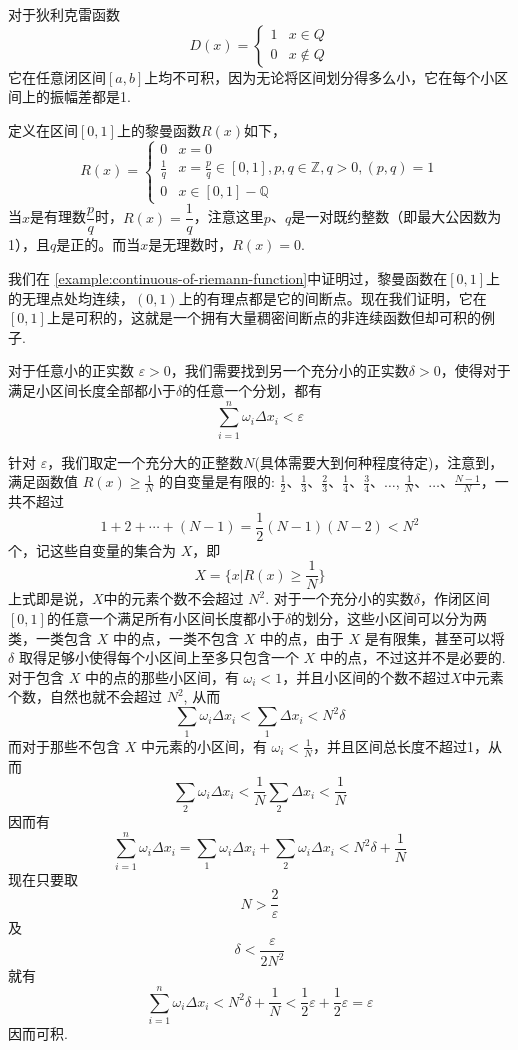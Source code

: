 \begin{example}
  对于狄利克雷函数
  \begin{equation*}
    D(x)=
    \begin{cases}
      1 & x \in Q \\
      0 & x \notin Q
    \end{cases}
  \end{equation*}
  它在任意闭区间$[a,b]$上均不可积，因为无论将区间划分得多么小，它在每个小区间上的振幅差都是1.
\end{example}

\begin{example}
    定义在区间$[0,1]$上的黎曼函数$R(x)$如下，
  \[ R(x) =
    \begin{cases}
      0 & x=0 \\
      \frac{1}{q} & x=\frac{p}{q} \in [0,1], p,q \in \mathbb{Z}, q >0, (p,q)=1 \\
      0 & x \in [0,1]-\mathbb{Q}
    \end{cases}
  \]
  当$x$是有理数$\dfrac{p}{q}$时，$R(x)=\dfrac{1}{q}$，注意这里$p$、$q$是一对既约整数（即最大公因数为1），且$q$是正的。而当$x$是无理数时，$R(x)=0$.

  我们在 \autoref{example:continuous-of-riemann-function}中证明过，黎曼函数在$[0,1]$上的无理点处均连续，$(0,1)$上的有理点都是它的间断点。现在我们证明，它在$[0,1]$上是可积的，这就是一个拥有大量稠密间断点的非连续函数但却可积的例子.

  对于任意小的正实数 $\varepsilon>0$，我们需要找到另一个充分小的正实数$\delta>0$，使得对于满足小区间长度全部都小于$\delta$的任意一个分划，都有
  \[ \sum_{i=1}^n\omega_i\Delta x_i<\varepsilon \]

  针对 $\varepsilon$，我们取定一个充分大的正整数$N$(具体需要大到何种程度待定)，注意到，满足函数值 $R(x) \geqslant \frac{1}{N}$ 的自变量是有限的: $\frac{1}{2}$、$\frac{1}{3}$、$\frac{2}{3}$、$\frac{1}{4}$、$\frac{3}{4}$、$\ldots$, $\frac{1}{N}$、$\ldots$、$\frac{N-1}{N}$，一共不超过
  \[ 1+2+\cdots+(N-1) = \frac{1}{2}(N-1)(N-2)<N^2 \]
  个，记这些自变量的集合为 $X$，即
  \[ X=\{x|R(x) \geqslant \frac{1}{N}\} \]
  上式即是说，$X$中的元素个数不会超过 $N^{2}$.
  对于一个充分小的实数$\delta$，作闭区间$[0,1]$的任意一个满足所有小区间长度都小于$\delta$的划分，这些小区间可以分为两类，一类包含 $X$ 中的点，一类不包含 $X$ 中的点，由于 $X$ 是有限集，甚至可以将 $\delta$ 取得足够小使得每个小区间上至多只包含一个 $X$ 中的点，不过这并不是必要的. 对于包含 $X$ 中的点的那些小区间，有 $\omega_i<1$，并且小区间的个数不超过$X$中元素个数，自然也就不会超过 $N^2$, 从而
  \[ \sum_1 \omega_i \Delta x_i < \sum_1 \Delta x_i < N^2\delta \]
  而对于那些不包含 $X$ 中元素的小区间，有 $\omega_i<\frac{1}{N}$，并且区间总长度不超过1，从而
  \[ \sum_2 \omega_i \Delta x_i < \frac{1}{N}\sum_2 \Delta x_i < \frac{1}{N} \]
  因而有
  \[ \sum_{i=1}^n \omega_i \Delta x_i = \sum_1 \omega_i \Delta x_i + \sum_2 \omega_i \Delta x_i < N^2\delta + \frac{1}{N} \]
  现在只要取
  \[ N>\frac{2}{\varepsilon} \]
  及
  \[ \delta < \frac{\varepsilon}{2N^2} \]
  就有
  \[ \sum_{i=1}^n \omega_i \Delta x_i < N^2\delta + \frac{1}{N} < \frac{1}{2}\varepsilon + \frac{1}{2}\varepsilon = \varepsilon \]
因而可积.
\end{example}

